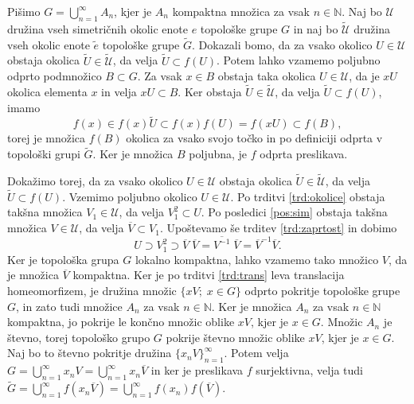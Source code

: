 \documentclass[mat1]{fmfdelo}
\newcommand{\N}{\mathbb N}
\newcommand{\Ucurl}{\mathcal{U}}
\newcommand{\closure}[1]{\overline{#1}}
\begin{document}
\begin{dokaz}
Pišimo $G = \bigcup_{n=1}^\infty A_n$, kjer je $A_n$ kompaktna množica za vsak $n \in \N$. Naj bo $\Ucurl$ družina vseh simetričnih okolic enote $e$ topološke grupe $G$ in naj bo $\widetilde{\Ucurl}$ družina vseh okolic enote $\tilde{e}$ topološke grupe $\widetilde{G}$. Dokazali bomo, da za vsako okolico $U \in \Ucurl$ obstaja okolica $\widetilde{U} \in \widetilde{\Ucurl}$, da velja $\widetilde{U} \subset f(U)$. Potem lahko vzamemo poljubno odprto podmnožico $B \subset G$. Za vsak $x \in B$ obstaja taka okolica $U \in \Ucurl$, da je $xU$ okolica elementa $x$ in velja $xU \subset B$. Ker obstaja $\widetilde{U} \in \widetilde{\Ucurl}$, da velja $\widetilde{U} \subset f(U)$, imamo
\[ f(x) \in f(x)\widetilde{U} \subset f(x)f(U) = f(xU) \subset f(B), \]
torej je množica $f(B)$ okolica za vsako svojo točko in po definiciji odprta v topološki grupi $\widetilde{G}$. Ker je množica $B$ poljubna, je $f$ odprta preslikava.

Dokažimo torej, da za vsako okolico $U \in \Ucurl$ obstaja okolica $\widetilde{U} \in \widetilde{\Ucurl}$, da velja $\widetilde{U} \subset f(U)$. Vzemimo poljubno okolico $U \in \Ucurl$. Po trditvi \ref{trd:okolice} obstaja takšna množica $V_1 \in \Ucurl$, da velja $V_1^2 \subset U$. Po posledici \ref{pos:sim} obstaja takšna množica $V \in \Ucurl$, da velja $\closure{V} \subset V_1$. Upoštevamo še trditev \ref{trd:zaprtost} in dobimo
\[ U \supset V_1^2 \supset \closure{V}\;\closure{V} = \closure{V^{-1}}\;\closure{V} = \closure{V}^{-1}\closure{V}. \]
Ker je topološka grupa $G$ lokalno kompaktna, lahko vzamemo tako množico $V$, da je množica $\closure{V}$ kompaktna.
Ker je po trditvi \ref{trd:trans} leva translacija homeomorfizem, je družina množic $\lbrace xV ;\; x \in G \rbrace$ odprto pokritje topološke grupe $G$, in zato tudi množice $A_n$ za vsak $n \in \N$. Ker je množica $A_n$ za vsak $n \in \N$ kompaktna, jo pokrije le končno množic oblike $xV$, kjer je $x \in G$. Množic $A_n$ je števno, torej topološko grupo $G$ pokrije števno množic oblike $xV$, kjer je $x \in G$. Naj bo to števno pokritje družina $\lbrace x_nV \rbrace_{n=1}^\infty$. Potem velja $G = \bigcup_{n=1}^\infty x_nV = \bigcup_{n=1}^\infty x_n\closure{V}$ in ker je preslikava $f$ surjektivna, velja tudi $\widetilde{G} = \bigcup_{n=1}^\infty f(x_n\closure{V}) = \bigcup_{n=1}^\infty f(x_n)f(\closure{V})$.


\end{dokaz}
\end{document}
